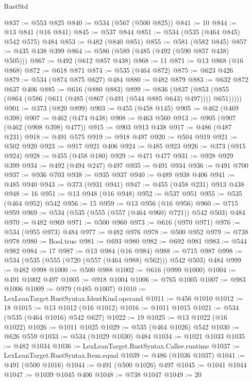 \begin{lexlean}{RustStd}
\begin{coremodule}
@837 := @553 @825
@840 := @534 (@567 (@500 @825))
@841 := 10
@844 := @13 @841 (@16 @841)
@845 := @537 @844
@851 := @534 (@535 (@464 @845) @542 @575) @484
@853 := @482 (@840 @851)
@855 := @581 (@582 @845)
@857 := @435 @438 @399
@864 := @586 (@589 (@485 (@492 (@590 @857 @438) @505)))
@867 := @492 (@612 @857 @438)
@868 := 11
@871 := @13 @868 (@16 @868)
@872 := @618 @871
@874 := @535 (@464 @872)
@875 := @623 @426
@879 := @534 (@874 @875 @627) @484
@880 := @482 @879
@883 := @632 @872 @637 @406
@885 := @616 (@880 @883)
@899 := @836
    (@837 (@853 (@855 (@864 (@586 (@611 (@485 (@867 (@491 (@544 @885 @643) @497)))) @651)))))
@901 := @373 (@820 @899)
@903 := @455 (@458 @145)
@905 := @462 (@469 @398)
@907 := @462 (@474 @438)
@908 := @463 @560
@913 := @905 (@907 (@462 (@908 @398) @477))
@915 := @903 @913 @438
@917 := @486 (@487 @231)
@918 := @491 @575
@919 := @918 @497
@920 := @504 @919
@921 := @502 @920
@923 := @917 @921 @406
@924 := @485 @923
@926 := @373 (@915 @924)
@928 := @455 (@458 @180)
@929 := @471 @477
@931 := @928 @929 @399
@934 := @492 (@494 @247) @497
@935 := @491 @934
@936 := @491 @700
@937 := @936 @703
@938 := @935 @937
@940 := @489 @938 @406
@941 := @485 @940
@943 := @373 (@931 @941)
@947 := @455 (@458 @231) @913 @438
@948 := 16
@951 := @13 @948 (@16 @948)
@952 := @537 @951
@955 := @535 (@464 @952) @542
@956 := 15
@959 := @13 @956 (@16 @956)
@960 := @715 @959
@969 := @534 (@535 (@555 (@557 (@464 @960) @721)) @542 @503) @484
@970 := @482 @969
@971 := @500 @960
@973 := @616 (@970 @971)
@976 := @534 (@955 @973) @484
@977 := @482 @976
@978 := @500 @952
@979 := @738 @978
@980 := Bool.true
@981 := @693 @980
@982 := @692 @981
@983 := @544 @982
@984 := 17
@987 := @13 @984 (@16 @984)
@988 := @715 @987
@998 := @534 (@535 (@555 (@720 (@557 (@464 @988) @562))) @542 @503) @484
@999 := @482 @998
@1000 := @500 @988
@1002 := @616 (@999 @1000)
@1004 := @491 @1002 @497
@1005 := @918 @1004
@1006 := @765 @1005
@1007 := @983 @1006
@1009 := @979 (@485 @1007)
@1010 := LexLeanTarget.RustSyntax.IdentKind.operand
@1011 := @456 @1010
@1012 := 18
@1015 := @13 @1012 (@16 @1012)
@1016 := @1011 @1015
@1021 := @534 (@535 (@464 @1016) @542 @627)
@1022 := 19
@1025 := @13 @1022 (@16 @1022)
@1026 := @1011 @1025
@1029 := @535 (@464 @1026) @542
@1030 := @626 @559
@1033 := @534 (@1029 @1030) @484
@1034 := @1021 @1033
@1035 := @482 @1034
@1036 := LexLeanTarget.RustSyntax.Callee.runtime
@1037 := LexLeanTarget.RustSyntax.Item.equal
@1039 := @486 (@1036 @1037)
@1041 := @491 (@500 @1016)
@1044 := @491 (@500 @1026) @497
@1045 := @1041 @1044
@1047 := @1039 @1045 @406
@1048 := @738 @1047
@1049 := 20

\end{coremodule}
\end{lexlean}
